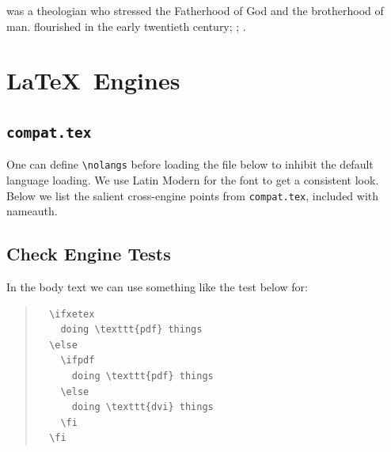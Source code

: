 \documentclass[oneside]{article}
\begin{document}
\renewcommand*\NameauthName{\MyName}
\renewcommand*\NameauthLName{\MyLName}
\renewcommand*\NameauthFName{\MyFName}

\ForgetThis{} was a theologian who stressed
the Fatherhood of God and the brotherhood of man.
 flourished in the early twentieth
century; ; .
\AltFormatInactive

\makeatletter
\renewcommand*\NameauthName{\@nameauth@Name}
\renewcommand*\NameauthLName{\@nameauth@Name}
\renewcommand*\NameauthFName{\@nameauth@Name}
\makeatother

\renewcommand*\NamesFormat{}
\renewcommand*\MainNameHook{}

%
%

\section{\protect\LaTeX\ Engines}

\subsection{\protect\texttt{compat.tex}}

One can define \Verb+\nolangs+ before loading the file below to inhibit
the default language loading. We use Latin Modern for the font to get
a consistent look. Below we list the salient cross-engine points from
\texttt{compat.tex}, included with \textsf{nameauth}.

\begin{quote}\small
\end{quote}

\subsection{Check Engine Tests}

In the body text we can use something like the test below for:\quad
{}

\begin{quote}\small
\begin{Verbatim}
  \ifxetex
    doing \texttt{pdf} things
  \else
    \ifpdf
      doing \texttt{pdf} things
    \else
      doing \texttt{dvi} things
    \fi
  \fi
\end{Verbatim}
\end{quote}
\end{document}

